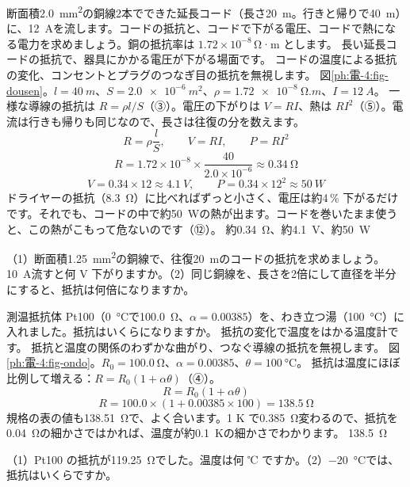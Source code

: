 \label{ph:電-4:ex3}
\begin{phreidai}[延長コードの電圧の下がり]
断面積\qty{2.0}{mm^2}の銅線2本でできた延長コード（長さ\qty{20}{m}。行きと帰りで\qty{40}{m}）に、\qty{12}{A}を流します。コードの抵抗と、コードで下がる電圧、コードで熱になる電力を求めましょう。銅の抵抗率は $1.72\times10^{-8}$\,Ω·m とします。
\phbamen
長い延長コードの抵抗で、器具にかかる電圧が下がる場面です。
\phmushi
コードの温度による抵抗の変化、コンセントとプラグのつなぎ目の抵抗を無視します。
\phzu
図\ref{ph:電-4:fig-dousen}。$l=\qty{40}{m}$、$S=\qty{2.0e-6}{m^2}$、$\rho=\qty{1.72e-8}{\ohm.m}$、$I=\qty{12}{A}$。
\phriyu
一様な導線の抵抗は $R=\rho l/S$（③）。電圧の下がりは $V=RI$、熱は $RI^2$（⑤）。電流は行きも帰りも同じなので、長さは往復の分を数えます。
\phtateru
\[R=\rho\frac{l}{S},\qquad V=RI,\qquad P=RI^2\]
\phtoku
\[R=1.72\times10^{-8}\times\frac{40}{2.0\times10^{-6}}\approx\qty{0.34}{\ohm}\]
\[V=0.34\times12\approx\qty{4.1}{V},\qquad P=0.34\times12^2\approx\qty{50}{W}\]
\phtashikame
ドライヤーの抵抗（\qty{8.3}{\ohm}）に比べればずっと小さく、電圧は約4\,\% 下がるだけです。それでも、コードの中で約\qty{50}{W}の熱が出ます。コードを巻いたまま使うと、この熱がこもって危ないのです（⑫）。
\kotae 約\qty{0.34}{\ohm}、約\qty{4.1}{V}、約\qty{50}{W}
\end{phreidai}
\begin{jibun}
（1）断面積\qty{1.25}{mm^2}の銅線で、往復\qty{20}{m}のコードの抵抗を求めましょう。\qty{10}{A}流すと何 V 下がりますか。（2）同じ銅線を、長さを2倍にして直径を半分にすると、抵抗は何倍になりますか。
\end{jibun}

\label{ph:電-4:ex4}
\begin{phreidai}[白金の温度計 Pt100]
測温抵抗体 Pt100（\qty{0}{\celsius}で\qty{100.0}{\ohm}、$\alpha=0.00385$）を、わき立つ湯（\qty{100}{\celsius}）に入れました。抵抗はいくらになりますか。
\phbamen
抵抗の変化で温度をはかる温度計です。
\phmushi
抵抗と温度の関係のわずかな曲がり、つなぐ導線の抵抗を無視します。
\phzu
図\ref{ph:電-4:fig-ondo}。$R_0=\qty{100.0}{\ohm}$、$\alpha=0.00385$、$\theta=\qty{100}{\celsius}$。
\phriyu
抵抗は温度にほぼ比例して増える：$R=R_0(1+\alpha\theta)$（④）。
\phtateru
\[R=R_0(1+\alpha\theta)\]
\phtoku
\[R=100.0\times(1+0.00385\times100)=\qty{138.5}{\ohm}\]
\phtashikame
規格の表の値も\qty{138.51}{\ohm}で、よく合います。1 K で\qty{0.385}{\ohm}変わるので、抵抗を\qty{0.04}{\ohm}の細かさではかれば、温度が約\qty{0.1}{K}の細かさでわかります。
\kotae \qty{138.5}{\ohm}
\end{phreidai}
\begin{jibun}
（1）Pt100 の抵抗が\qty{119.25}{\ohm}でした。温度は何 ℃ ですか。（2）\qty{-20}{\celsius}では、抵抗はいくらですか。
\end{jibun}

